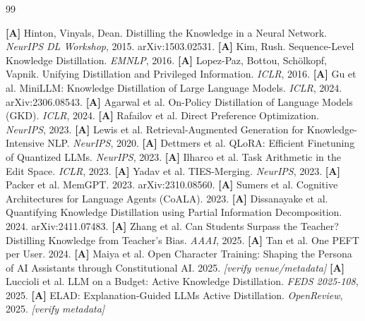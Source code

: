 \documentclass[11pt]{article}
\begin{document}
\begin{thebibliography}{99}\footnotesize

 \textbf{[A]} Hinton, Vinyals, Dean. Distilling the Knowledge in a Neural Network. \emph{NeurIPS DL Workshop}, 2015. arXiv:1503.02531.
 \textbf{[A]} Kim, Rush. Sequence-Level Knowledge Distillation. \emph{EMNLP}, 2016.
 \textbf{[A]} Lopez-Paz, Bottou, Sch\"olkopf, Vapnik. Unifying Distillation and Privileged Information. \emph{ICLR}, 2016.
 \textbf{[A]} Gu et al. MiniLLM: Knowledge Distillation of Large Language Models. \emph{ICLR}, 2024. arXiv:2306.08543.
 \textbf{[A]} Agarwal et al. On-Policy Distillation of Language Models (GKD). \emph{ICLR}, 2024.
 \textbf{[A]} Rafailov et al. Direct Preference Optimization. \emph{NeurIPS}, 2023.
 \textbf{[A]} Lewis et al. Retrieval-Augmented Generation for Knowledge-Intensive NLP. \emph{NeurIPS}, 2020.
 \textbf{[A]} Dettmers et al. QLoRA: Efficient Finetuning of Quantized LLMs. \emph{NeurIPS}, 2023.
 \textbf{[A]} Ilharco et al. Task Arithmetic in the Edit Space. \emph{ICLR}, 2023.
 \textbf{[A]} Yadav et al. TIES-Merging. \emph{NeurIPS}, 2023.
 \textbf{[A]} Packer et al. MemGPT. 2023. arXiv:2310.08560.
 \textbf{[A]} Sumers et al. Cognitive Architectures for Language Agents (CoALA). 2023.
 \textbf{[A]} Dissanayake et al. Quantifying Knowledge Distillation using Partial Information Decomposition. 2024. arXiv:2411.07483.
 \textbf{[A]} Zhang et al. Can Students Surpass the Teacher? Distilling Knowledge from Teacher's Bias. \emph{AAAI}, 2025.
 \textbf{[A]} Tan et al. One PEFT per User. 2024.
 \textbf{[A]} Maiya et al. Open Character Training: Shaping the Persona of AI Assistants through Constitutional AI. 2025. \emph{[verify venue/metadata]}
 \textbf{[A]} Luccioli et al. LLM on a Budget: Active Knowledge Distillation. \emph{FEDS 2025-108}, 2025.
 \textbf{[A]} ELAD: Explanation-Guided LLMs Active Distillation. \emph{OpenReview}, 2025. \emph{[verify metadata]}

\end{thebibliography}
\end{document}
